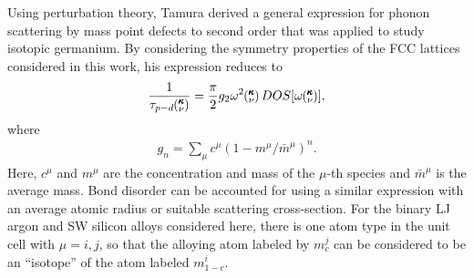 Using perturbation theory, Tamura derived a general expression for 
phonon scattering by mass point defects to second order that was applied 
to study isotopic germanium.\cite{tamura_isotope_1983}   
By considering the symmetry properties of the FCC lattices 
considered in this work, his expression reduces to 
\begin{equation}\label{EQ:taud_dos}
\begin{split}
\frac{1}{\tau_{p-d}\kv} =\frac{\pi}{2} g_2 \omega^2\kv DOS[\omega\kv], 
\end{split}
\end{equation}
where  
\begin{equation}\label{EQ:gn}
\begin{split}
g_n = \sum_\mu c^{\mu}(1-m^{\mu}/\bar{m}^{\mu})^n.
\end{split}
\end{equation}
Here, $c^\mu$ and $m^\mu$ are the concentration and  
mass of the $\mu$-th species 
and $\bar{m}^{\mu}$ is the average mass. Bond disorder 
can be accounted for using a similar expression with an average
atomic radius or suitable scattering cross-section.
\cite{klemens_scattering_1955,klemens_thermal_1957} 
For the binary LJ argon and SW silicon alloys considered here, 
there is one atom type in the unit cell  
with $\mu=i,j$, so that the alloying atom labeled by $m^j_{c}$ 
can be considered to be an ``isotope'' of the atom labeled 
$m^i_{1-c}$.

